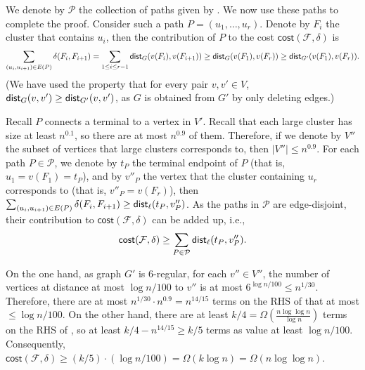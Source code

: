 \documentclass[11pt]{article}
\theoremstyle{definition}
\newcommand{\pset}{{\mathcal{P}}}
\newcommand{\fset}{{\mathcal{F}}}
\newcommand{\dist}{\textnormal{\textsf{dist}}}
\newcommand\vol{\mathsf{cost}}
\newcounter{note}
\begin{document}
We denote by $\pset$ the collection of paths given by .
We now use these paths to complete the proof.
%
Consider such a path $P=(u_1,\ldots, u_r)$. Denote by $F_i$ the cluster that contains $u_i$, then the contribution of $P$ to the cost $\vol(\fset,\delta)$ is
\[\sum_{(u_i,u_{i+1})\in E(P)}\delta(F_i,F_{i+1})=\sum_{1\le i\le r-1}\dist_{G}(v(F_i),v(F_{i+1}))\ge \dist_{G}(v(F_1),v(F_{r}))\ge \dist_{G'}(v(F_1),v(F_{r})).\]
(We have used the property that for every pair $v,v'\in V$, $\dist_G(v,v')\ge \dist_{G'}(v,v')$, as $G$ is obtained from $G'$ by only deleting edges.)

Recall $P$ connects a terminal to a vertex in $V'$.
Recall that each large cluster has size at least $n^{0.1}$, so there are at most $n^{0.9}$ of them. Therefore, if we denote by $V''$ the subset of vertices that large clusters corresponds to, then $|V''|\le n^{0.9}$.
For each path $P\in \pset$, we denote by $t_P$ the terminal endpoint of $P$ (that is, $u_1=v(F_1)=t_P$), and by $v''_P$ the vertex that the cluster containing $u_r$ corresponds to (that is, $v''_P=v(F_r)$), then $\sum_{(u_i,u_{i+1})\in E(P)}\delta(F_i,F_{i+1})\ge \dist_{\ell}(t_P,v''_P)$.
As the paths in $\pset$ are edge-disjoint, their contribution to $\vol(\fset,\delta)$ can be added up, i.e., 
\begin{equation}\label{eqn: cost}
\vol(\fset,\delta)\ge \sum_{P\in \pset}\dist_{\ell}(t_P,v''_P).
\end{equation}

On the one hand, as graph $G'$ is $6$-regular, for each $v''\in V''$, the number of vertices at distance at most $\log n/100$ to $v''$ is at most $6^{\log n/100}\le n^{1/30}$. Therefore, there are at most $n^{1/30}\cdot n^{0.9}=n^{14/15}$ terms on the RHS of  that at most $\le \log n/100$.
On the other hand, there are at least $k/4=\Omega(\frac{n\log \log n}{\log n})$ terms on the RHS of , so at least $k/4-n^{14/15}\ge k/5$ terms as value at least $\log n/100$. Consequently, $\vol(\fset,\delta)\ge (k/5)\cdot (\log n/100)=\Omega(k \log n)=\Omega(n\log\log n)$.











\end{document}
